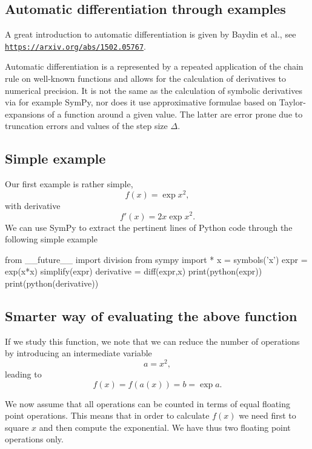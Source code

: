 \documentclass[%
oneside,                 %
final,                   %
10pt]{article}
\begin{document}
\subsection{Automatic differentiation through examples}

A great introduction to automatic differentiation is given by Baydin et al., see \href{{https://arxiv.org/abs/1502.05767}}{\nolinkurl{https://arxiv.org/abs/1502.05767}}.

Automatic differentiation is a represented by a repeated application
of the chain rule on well-known functions and allows for the
calculation of derivatives to numerical precision. It is not the same
as the calculation of symbolic derivatives via for example SymPy, nor
does it use approximative formulae based on Taylor-expansions of a
function around a given value. The latter are error prone due to
truncation errors and values of the step size $\Delta$.

\subsection{Simple example}

Our first example is rather simple,
\[
f(x) =\exp{x^2},
\]
with derivative
\[
f'(x) =2x\exp{x^2}.
\]
We can use SymPy to extract the pertinent lines of Python code through the following simple example









\bpycod
from __future__ import division
from sympy import *
x = symbols('x')
expr = exp(x*x)
simplify(expr)
derivative = diff(expr,x)
print(python(expr))
print(python(derivative))

\epycod


\subsection{Smarter way of evaluating the above function}
If we study this function, we note that we can reduce the number of operations by introducing an intermediate variable
\[
a = x^2,
\]
leading to 
\[
f(x) = f(a(x)) = b= \exp{a}.
\]

We now assume that all operations can be counted in terms of equal
floating point operations. This means that in order to calculate
$f(x)$ we need first to square $x$ and then compute the exponential. We
have thus two floating point operations only.
\end{document}
